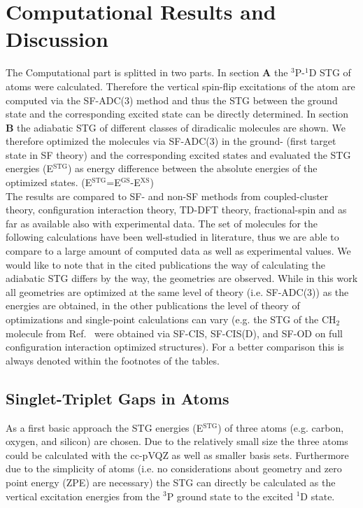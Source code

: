 \documentclass[aip,graphicx,amsmath,reprint]{revtex4-1}
\begin{document}
\section{Computational Results and Discussion}
The Computational part is splitted in two parts. In section {\bf{A}} the $^3$P-$^1$D STG of atoms were calculated. Therefore the vertical spin-flip excitations of the atom are computed via the SF-ADC(3) method and thus the STG between the ground state and the corresponding excited state can be directly determined. In section {\bf{B}} the adiabatic STG of different classes of diradicalic molecules are shown. We therefore optimized the molecules via SF-ADC(3) in the ground- (first target state in SF theory) and the corresponding excited states and evaluated the STG energies (E$^{{\text{STG}}}$) as energy difference between the absolute energies of the optimized states. (E$^{{\text{STG}}}$=E$^{{\text{GS}}}$-E$^{{\text{XS}}}$)\\
The results are compared to SF- and non-SF methods from coupled-cluster theory\cite{Krylov2002}, configuration interaction theory\cite{Krylov2002}, TD-DFT theory\cite{Ziegler2005, Krylov2003, Yang2015}, fractional-spin\cite{Yang2011} and as far as available also with experimental data\cite{Herzberg1979, Lineberger1998, Lineberger1996, Jensen2000, Kraemer1997, Ruscic1987, Campargue1998, Cho1989, Bunker1998}. The set of molecules for the following calculations have been well-studied in literature, thus we are able to compare to a large amount of computed data as well as experimental values.\cite{Krylov2002, Ziegler2005, Krylov2003, Yang2015, Yang2011} We would like to note that in the cited publications the way of calculating the adiabatic STG differs by the way, the geometries are observed. While in this work all geometries are optimized at the same level of theory (i.e. SF-ADC(3)) as the energies are obtained, in the other publications the level of theory of optimizations and single-point calculations can vary (e.g. the STG of the CH$_2$ molecule from Ref.~ were obtained via SF-CIS, SF-CIS(D), and SF-OD on full configuration interaction optimized structures). For a better comparison this is always denoted within the footnotes of the tables.


\subsection{Singlet-Triplet Gaps in Atoms}
As a first basic approach the STG energies (E${^{{\text{STG}}}}$) of three atoms (e.g. carbon, oxygen, and silicon) are chosen. Due to the relatively small size the three atoms could be calculated with the cc-pVQZ as well as smaller basis sets. Furthermore due to the simplicity of atoms (i.e. no considerations about geometry and zero point energy (ZPE) are necessary) the STG can directly be calculated as the vertical excitation energies from the $^3$P ground state to the excited $^1$D state.
\end{document}
